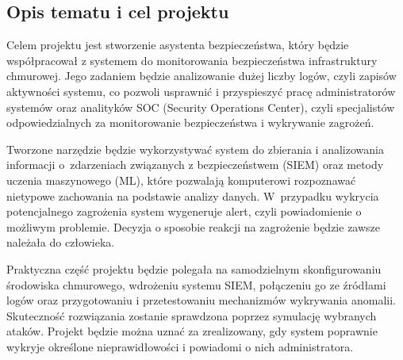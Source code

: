 \documentclass[11pt,a4paper,oneside]{article}
\newif\ifpodpowiedzi
\newcommand{\podpowiedz}[1]{\ifpodpowiedzi\par\begingroup\small\color{hintcolor}\textit{Wskazówka: #1}\par\endgroup\fi}
\begin{document}
\subsection{Opis tematu i cel projektu}
\podpowiedz{Opisz problem, odbiorców i zamierzony rezultat. Jeśli korzystasz z opisu prowadzących, dostosuj go do uzgodnionego zakresu. Wyjaśnij, na czym polega praktyczny i inżynierski charakter pracy oraz po czym będzie można poznać, że cel został osiągnięty.}
{Celem projektu jest stworzenie asystenta bezpieczeństwa, który będzie współpracował z systemem do monitorowania bezpieczeństwa infrastruktury chmurowej. Jego zadaniem będzie analizowanie dużej liczby logów, czyli zapisów aktywności systemu, co pozwoli usprawnić i przyspieszyć pracę administratorów systemów oraz analityków SOC (Security Operations Center), czyli specjalistów odpowiedzialnych za monitorowanie bezpieczeństwa i wykrywanie zagrożeń.

Tworzone narzędzie będzie wykorzystywać system do zbierania i analizowania informacji o~zdarzeniach związanych z bezpieczeństwem (SIEM) oraz metody uczenia maszynowego (ML), które pozwalają komputerowi rozpoznawać nietypowe zachowania na podstawie analizy danych. W~przypadku wykrycia potencjalnego zagrożenia system wygeneruje alert, czyli powiadomienie o możliwym problemie. Decyzja o sposobie reakcji na zagrożenie będzie zawsze należała do człowieka.

Praktyczna część projektu będzie polegała na samodzielnym skonfigurowaniu środowiska chmurowego, wdrożeniu systemu SIEM, połączeniu go ze źródłami logów oraz przygotowaniu i przetestowaniu mechanizmów wykrywania anomalii. Skuteczność rozwiązania zostanie sprawdzona poprzez symulację wybranych ataków. Projekt będzie można uznać za zrealizowany, gdy system poprawnie wykryje określone nieprawidłowości i powiadomi o nich administratora.}
\end{document}
